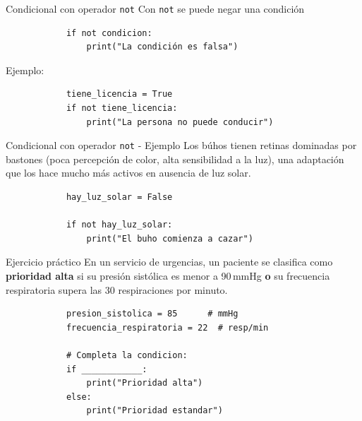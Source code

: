 \documentclass{beamer}
\begin{document}
    \begin{frame}[fragile,t]{Condicional con operador \texttt{not}}
        Con \texttt{not} se puede negar una condición
        \begin{verbatim}
            if not condicion:
                print("La condición es falsa")
        \end{verbatim}
        Ejemplo:
        \begin{verbatim}
            tiene_licencia = True
            if not tiene_licencia:
                print("La persona no puede conducir")
        \end{verbatim}
    \end{frame}

    \begin{frame}[fragile,t]{Condicional con operador \texttt{not} - Ejemplo}
        Los búhos tienen retinas dominadas por bastones (poca
        percepción de color, alta sensibilidad a la luz), una
        adaptación que los hace mucho más activos en ausencia
        de luz solar.

        \begin{verbatim}
            hay_luz_solar = False

            if not hay_luz_solar:
                print("El buho comienza a cazar")
         \end{verbatim}
    \end{frame}

    \begin{frame}[fragile,t]{Ejercicio práctico}
        En un servicio de urgencias, un paciente se clasifica como
        \textbf{prioridad alta} si su presión sistólica es menor a
        90\,mmHg \textbf{o} su frecuencia respiratoria supera las
        30 respiraciones por minuto.
        \begin{verbatim}
            presion_sistolica = 85      # mmHg
            frecuencia_respiratoria = 22  # resp/min
            
            # Completa la condicion:
            if ____________:
                print("Prioridad alta")
            else:
                print("Prioridad estandar")
        \end{verbatim}
    \end{frame}
\end{document}
